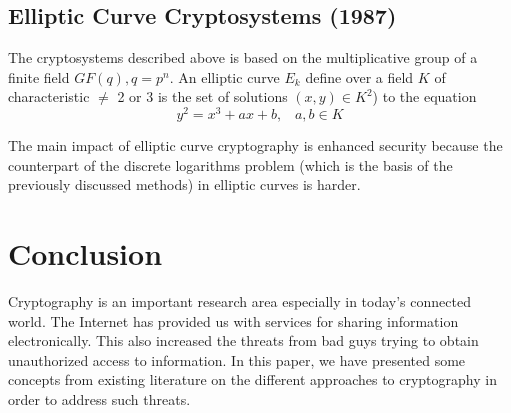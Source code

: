 \documentclass{article}
\begin{document}
\subsection{Elliptic Curve Cryptosystems (1987)}

The cryptosystems described above is based on the multiplicative group
of a finite field $GF(q),q=p^{n}$\cite{koblitz_elliptic_1987}. An
elliptic curve $E_{k}$ define over a field $K$ of characteristic
$\neq$ 2 or 3 is the set of solutions $(x,y)\in K^{2}$) to the equation
\[
y^{2}=x^{3}+ax+b,\;\;\; a,b\in K
\]


The main impact of elliptic curve cryptography is enhanced security
because the counterpart of the discrete logarithms problem (which
is the basis of the previously discussed methods) in elliptic curves
is harder\cite{koblitz_elliptic_1987}. 


\section{Conclusion} 

Cryptography is an important research area especially in today's connected world. The Internet has provided us with services for sharing information electronically. This also increased the threats from bad guys trying to obtain unauthorized access to information. In this paper, we have presented some concepts from existing literature on the different approaches to cryptography in order to address such threats.



\nocite{*}
\end{document}
